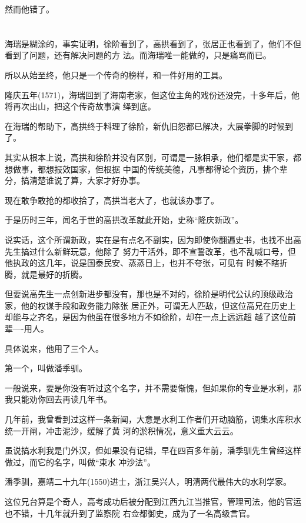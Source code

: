 \documentclass[11pt,a4paper,onecolumn]{article}
\begin{document}
然而他错了。

\section[\thesection]{}

海瑞是糊涂的，事实证明，徐阶看到了，高拱看到了，张居正也看到了，他们不但看到了问题，还有解决问题的方
法。而海瑞唯一能做的，只是痛骂而已。

所以从始至终，他只是一个传奇的榜样，和一件好用的工具。

隆庆五年(1571)，海瑞回到了海南老家，但这位主角的戏份还没完，十多年后，他将再次出山，把这个传奇故事演
绎到底。

在海瑞的帮助下，高拱终于料理了徐阶，新仇旧怨都已解决，大展拳脚的时候到了。

其实从根本上说，高拱和徐阶并没有区别，可谓是一脉相承，他们都是实干家，都想做事，都想报效国家，但根据
中国的传统美德，凡事都得论个资历，排个辈分，搞清楚谁说了算，大家才好办事。

现在敢争敢抢的都收拾了，高拱当老大了，也就该办事了。

于是历时三年，闻名于世的高拱改革就此开始，史称``隆庆新政''。

说实话，这个所谓新政，实在是有点名不副实，因为即使你翻遍史书，也找不出高先生搞过什么新鲜玩意，他除了
努力干活外，即不宣誓改革，也不乱喊口号，但他执政的这几年，说是国泰民安、蒸蒸日上，也并不夸张，可见有
时候不瞎折腾，就是最好的折腾。

但要说高先生一点创新进步都没有，那也是不对的，徐阶是明代公认的顶级政治家，他的权谋手段和政务能力除张
居正外，可谓无人匹敌，但这位高兄在历史上却能与之齐名，是因为他虽在很多地方不如徐阶，却在一点上远远超
越了这位前辈----用人。

具体说来，他用了三个人。

第一个，叫做潘季驯。

一般说来，要是你没有听过这个名字，并不需要惭愧，但如果你的专业是水利，那我只能劝你回去再读几年书。

几年前，我曾看到过这样一条新闻，大意是水利工作者们开动脑筋，调集水库积水统一开闸，冲击泥沙，缓解了黄
河的淤积情况，意义重大云云。

虽说搞水利我是门外汉，但如果没有记错，早在四百多年前，潘季驯先生曾经这样做过，而它的名字，叫做``束水
冲沙法''。

潘季驯，嘉靖二十九年(1550)进士，浙江吴兴人，明清两代最伟大的水利学家。

这位兄台算是个奇人，高考成功后被分配到江西九江当推官，管理司法，他的官运也不错，十几年就升到了监察院
右佥都御史，成为了一名高级言官。
\end{document}
